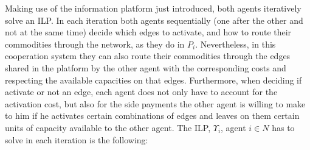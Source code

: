 \documentclass{article}
\begin{document}
Making use of the information platform just introduced, both agents iteratively solve an ILP. In each iteration both agents sequentially (one after the other and not at the same time) decide which edges to activate, and how to route their commodities through the network, as they do in $P_i$. Nevertheless, in this cooperation system they can also route their commodities through the edges shared in the platform by the other agent with the corresponding costs and respecting the available capacities on that edges. Furthermore, when deciding if activate or not an edge, each agent does not only have to account for the activation cost, but also for the side payments the other agent is willing to make to him if he activates certain combinations of edges and leaves on them certain units of capacity available to the other agent. The ILP, $\Upsilon_i$, agent $i\in N$ has to solve in each iteration is the following:
\end{document}
